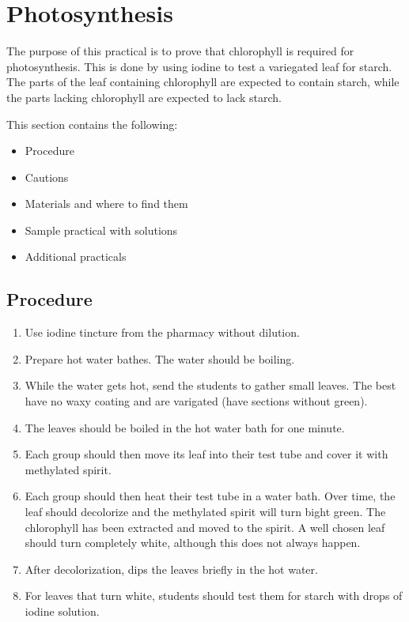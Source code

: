 \section{Photosynthesis}  

The purpose of this practical is to prove that chlorophyll is required for photosynthesis. This is done by using iodine to test a variegated leaf for starch. The parts of the leaf containing chlorophyll are expected to contain starch, while the parts lacking chlorophyll are expected to lack starch.

This section contains the following:
\begin{itemize}
\item{Procedure}
\item{Cautions}
\item{Materials and where to find them}
\item{Sample practical with solutions}
\item{Additional practicals}
\end{itemize}

\subsection{Procedure}
\begin{enumerate}
\item{Use iodine tincture from the pharmacy without dilution.}
\item{Prepare hot water bathes. The water should be boiling.}
\item{While the water gets hot, send the students to gather small leaves. The best have no waxy coating and are varigated (have sections without green).}
\item{The leaves should be boiled in the hot water bath for one minute.}
\item{Each group should then move its leaf into their test tube and cover it with methylated spirit.}
\item{Each group should then heat their test tube in a water bath. Over time, the leaf should decolorize and the methylated spirit will turn bight green. The chlorophyll has been extracted and moved to the spirit. A well chosen leaf should turn completely white, although this does not always happen.}
\item{After decolorization, dips the leaves briefly in the hot water.}
\item{For leaves that turn white, students should test them for starch with drops of iodine solution.}
\end{enumerate}

